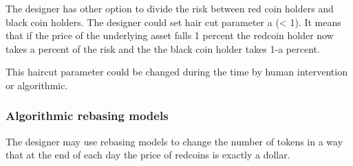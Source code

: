 The designer has other option to divide the risk between red coin holders and black coin holders. The designer could set hair cut parameter a (< 1). It means that if the price of the underlying asset falls 1 percent the redcoin holder now takes a percent of the risk and the the black coin holder takes 1-a percent.

This haircut parameter could be changed during the time by human intervention or algorithmic.


\subsubsection{Algorithmic rebasing models}

The designer may use rebasing models to change the number of tokens in a way that at the end of each day the price of redcoins is exactly a dollar.
